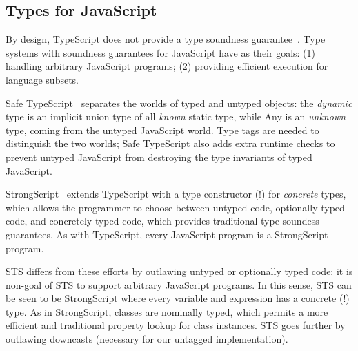 






\subsection{Types for JavaScript}

By design, TypeScript does not provide a type soundness guarantee~\cite{BiermanAT14}.
Type systems with soundness guarantees for JavaScript have as their
goals: (1) handling arbitrary JavaScript programs;
(2) providing efficient execution for language subsets.

Safe TypeScript~\cite{SafeTypeScript15} separates the worlds of typed and untyped
objects: the \emph{dynamic} type is an implicit union type of all \emph{known} static type,
while Any is an \emph{unknown} type, coming from the untyped JavaScript world. Type tags
are needed to distinguish the two worlds; Safe TypeScript also adds extra runtime checks
to prevent untyped JavaScript from destroying the type invariants of typed JavaScript.

StrongScript~\cite{StrongScriptECOOP15} extends TypeScript with a type constructor (!)
for \emph{concrete} types, which allows the programmer to choose between untyped
code, optionally-typed code, and concretely typed code, which provides traditional
type soundess guarantees. As with TypeScript, every JavaScript program is a StrongScript program.

STS differs from these efforts by outlawing untyped or optionally typed
code: it is non-goal of STS to support arbitrary JavaScript programs.
In this sense, STS can be seen to be StrongScript where every variable and
expression has a concrete (!) type. As in StrongScript, classes are nominally typed,
which permits a more efficient and traditional property lookup for class instances.
STS goes further by outlawing downcasts (necessary for our untagged
implementation).

